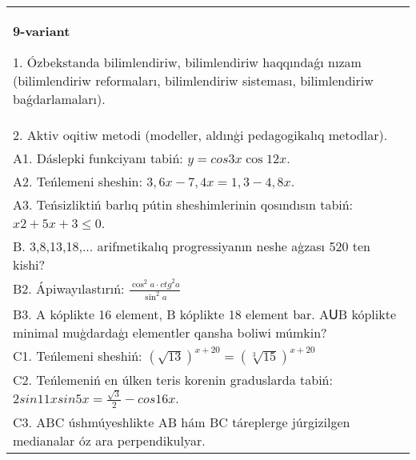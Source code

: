 \documentclass{article}
\begin{document}
\begin{tabular}{m{17cm}}
\textbf{9-variant}

1. Ózbekstanda bilimlendiriw, bilimlendiriw haqqındaǵı nızam (bilimlendiriw reformaları, bilimlendiriw sisteması, bilimlendiriw baǵdarlamaları). \\
2. Aktiv oqitiw metodi (modeller, aldınģi pedagogikalıq metodlar). \\
A1. Dáslepki funkciyanı tabiń: \(y=cos{3x}\cos{12x}\). \\
A2. Teńlemeni sheshin: \(3,6x - 7,4x = 1,3 - 4,8x\). \\
A3. Teńsizliktiń barlıq pútin sheshimlerinin qosındısın tabiń: \(x2 + 5x + 3 \leq 0\). \\
B. 3,8,13,18,... arifmetikalıq progressiyanın neshe aģzası 520 ten kishi? \\
B2. Ápiwayılastırıń: \(\frac{\cos^{2}a \cdot {ctg}^{2}a}{\sin^{2}a}\) \\
B3. A kóplikte 16 element, B kóplikte 18 element bar. AՍB kóplikte minimal muģdardaģı elementler qansha boliwi múmkin? \\
C1. Teńlemeni sheshiń: \((\sqrt{13}) ^{x + 20} = (\sqrt[3]{15}) ^{x + 20}\) \\
C2. Teńlemeniń en úlken teris korenin graduslarda tabiń: \(2sin11xsin5x = \frac{\sqrt{3}}{2} - cos16x\). \\
C3. ABC úshmúyeshlikte AB hám BC táreplerge júrgizilgen medianalar óz ara perpendikulyar. \\

\end{tabular}
\vspace{1cm}
\end{document}
